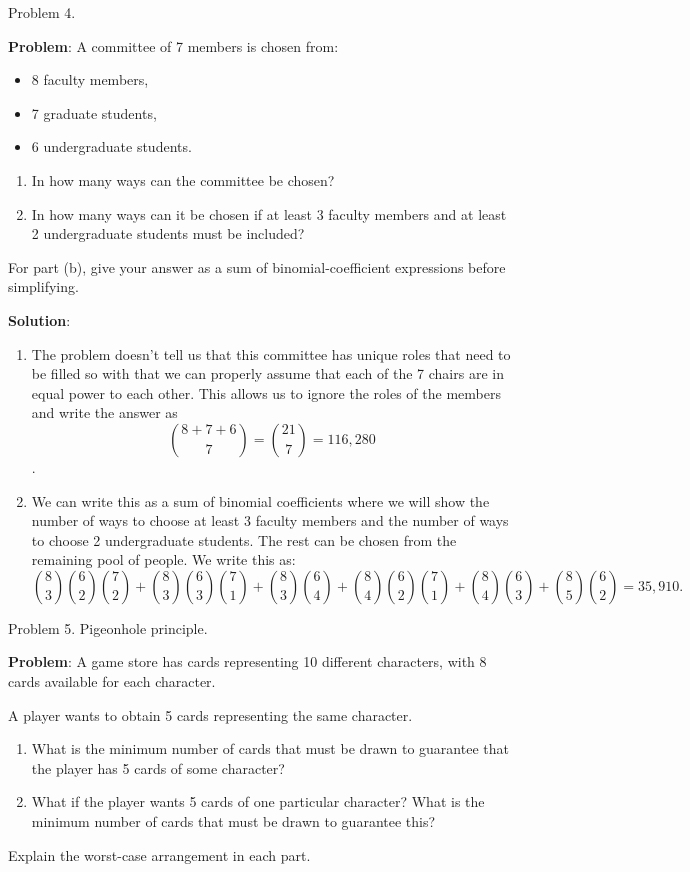 \documentclass{article}
\begin{document}
Problem 4.

\textbf{Problem}: A committee of 7 members is chosen from:
\begin{itemize}
    \item 8 faculty members,
    \item 7 graduate students,
    \item 6 undergraduate students.
\end{itemize}

\begin{enumerate}[label=\alph*.]
  \item In how many ways can the committee be chosen?
  \item In how many ways can it be chosen if at least 3 faculty members and at least 2 undergraduate students must be included?
\end{enumerate}
For part (b), give your answer as a sum of binomial-coefficient expressions before simplifying.

\textbf{Solution}: 
\begin{enumerate}[label=\alph*.]
  \item The problem doesn't tell us that this committee has unique roles that need to be filled so with that we can properly assume that each of the 7 chairs are in equal power to each other. This allows us to ignore the roles of the members and write the answer as $$\binom{8 + 7 + 6}{7} = \binom{21}{7} = 116,280$$.
  \item We can write this as a sum of binomial coefficients where we will show the number of ways to choose at least 3 faculty members and the number of ways to choose 2 undergraduate students. The rest can be chosen from the remaining pool of people. We write this as: \[
\binom{8}{3}\binom{6}{2}\binom{7}{2}
+\binom{8}{3}\binom{6}{3}\binom{7}{1}
+\binom{8}{3}\binom{6}{4}
+\binom{8}{4}\binom{6}{2}\binom{7}{1}
+\binom{8}{4}\binom{6}{3}
+\binom{8}{5}\binom{6}{2}
= 35{,}910.
\]
\end{enumerate} 

Problem 5. Pigeonhole principle.

\textbf{Problem}: A game store has cards representing 10 different characters, with 8 cards available for each character.

A player wants to obtain 5 cards representing the same character.

\begin{enumerate}[label=(\alph*)]
  \item What is the minimum number of cards that must be drawn to guarantee that the player has 5 cards of some character?
  \item What if the player wants 5 cards of one particular character? What is the minimum number of cards that must be drawn to guarantee this?
\end{enumerate}
Explain the worst-case arrangement in each part.
\end{document}
